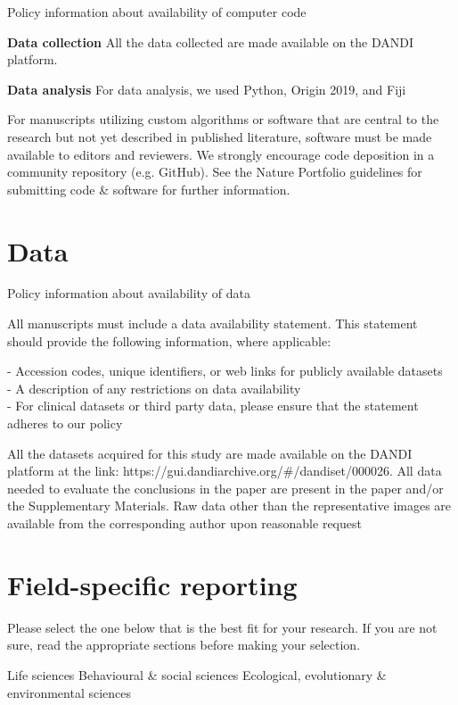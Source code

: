 \documentclass{article}
\begin{document}
\noindent Policy information about availability of computer code

\noindent \textbf{Data collection} All the data collected are made available on the DANDI platform.

\noindent \textbf{Data analysis} For data analysis, we used Python, Origin 2019, and Fiji

\noindent For manuscripts utilizing custom algorithms or software that are central to the research but not yet described in published literature, software must be made available to editors and reviewers. We strongly encourage code deposition in a community repository (e.g. GitHub). See the Nature Portfolio guidelines for submitting code \& software for further information.

\section*{Data}

\noindent Policy information about availability of data

\noindent All manuscripts must include a data availability statement. This statement should provide the following information, where applicable:

\noindent - Accession codes, unique identifiers, or web links for publicly available datasets\\
- A description of any restrictions on data availability\\
- For clinical datasets or third party data, please ensure that the statement adheres to our policy

\noindent All the datasets acquired for this study are made available on the DANDI platform at the link: https://gui.dandiarchive.org/\#/dandiset/000026. All data needed to evaluate the conclusions in the paper are present in the paper and/or the Supplementary Materials. Raw data other than the representative images are available from the corresponding author upon reasonable request

\section*{Field-specific reporting}

\noindent Please select the one below that is the best fit for your research. If you are not sure, read the appropriate sections before making your selection.

\noindent Life sciences    Behavioural \& social sciences    Ecological, evolutionary \& environmental sciences
\end{document}
